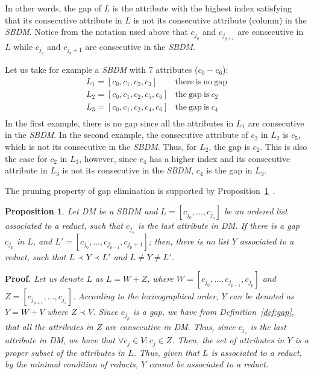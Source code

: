 \documentclass[letterpaper, twoside, openright, 12pt]{book}%
\newtheorem{proposition}{Proposition}
\begin{document}
	In other words, the gap of $L$ is the attribute with the highest index satisfying that its consecutive attribute in $L$ is not its consecutive attribute (column) in the \textit{SBDM}. Notice from the notation used above that $c_{j_q}$ and $c_{j_{q+1}}$ are consecutive in $L$ while $c_{j_q}$ and $c_{j_q+1}$ are consecutive in the \textit{SBDM}.
	
	Let us take for example a \textit{SBDM} with 7 attributes ($c_0 - c_6$):
	$$\begin{array}{ll}
	{L_1=[c_0,c_1,c_2,c_3]} 		& \mathrm{there~is~no~gap}\\
	{L_2=[c_0,c_1,c_2,c_5,c_6]} 	& \mathrm{the~gap~is~} c_2\\
	{L_3=[c_0,c_1,c_2,c_4,c_6]} 	& \mathrm{the~gap~is~} c_4\\
	\end{array}$$
	In the first example, there is no gap since all the attributes in $L_1$ are consecutive in the \textit{SBDM}. In the second example, the consecutive attribute of $c_2$ in $L_2$ is $c_5$, which is not its consecutive in the \textit{SBDM}. Thus, for $L_2$, the gap is $c_2$. This is also the case for $c_2$ in $L_3$, however, since $c_4$ has a higher index and its consecutive attribute in $L_3$ is not its consecutive in the \textit{SBDM}, $c_4$ is the gap in $L_3$.


	The pruning property of gap elimination is supported by Proposition~\ref{prop:gap}~\citep{Santiesteban03}. 
		
	\begin{proposition}\label{prop:gap} 
		Let DM be a SBDM and $L = [c_{j_0},...,c_{j_s}]$ be an ordered list associated to a reduct, such that $c_{j_s}$ is the last attribute in DM. If there is a gap $c_{j_p}$ in $L$, and $L'=[c_{j_0},\dots,c_{j_{p-1}},c_{j_p+1}]$; then, there is no list $Y$ associated to a reduct, such that $L \prec Y \prec L'$ and $L \neq Y \neq L'$.
	\end{proposition}	
	
	\noindent
	\textbf{Proof.} \textit{\label{proof:gap} 
	Let us denote $L$ as $L=W+Z$, where $W=[c_{j_0},\dots,c_{j_{p-1}}, c_{j_p}]$ and $Z=[c_{j_{p+1}}, \dots, c_{j_s}]$. According to the lexicographical order, $Y$ can be denoted as $Y=W+V$ where $Z \prec V$. Since $c_{j_p}$ is a gap, we have from Definition~\ref{def:gap}, that all the attributes in $Z$ are consecutive in DM. Thus, since $c_{j_s}$ is the last attribute in DM, we have that $\forall c_j \in V: c_j \in Z$. Then, the set of attributes in $Y$ is a proper subset of the attributes in $L$. Thus, given that $L$ is associated to a reduct, by the minimal condition of reducts, $Y$ cannot be associated to a reduct.}
	
\end{document}

